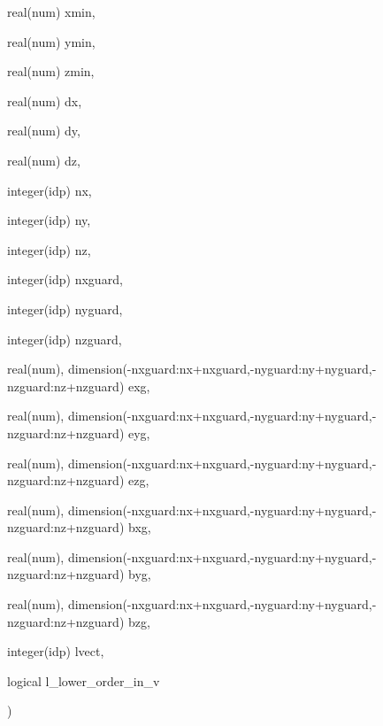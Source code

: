 {\begin{DoxyParamCaption}
\item[{real(num)}]{xmin, }
\item[{real(num)}]{ymin, }
\item[{real(num)}]{zmin, }
\item[{real(num)}]{dx, }
\item[{real(num)}]{dy, }
\item[{real(num)}]{dz, }
\item[{integer(idp)}]{nx, }
\item[{integer(idp)}]{ny, }
\item[{integer(idp)}]{nz, }
\item[{integer(idp)}]{nxguard, }
\item[{integer(idp)}]{nyguard, }
\item[{integer(idp)}]{nzguard, }
\item[{real(num), dimension(-\/nxguard\+:nx+nxguard,-\/nyguard\+:ny+nyguard,-\/nzguard\+:nz+nzguard)}]{exg, }
\item[{real(num), dimension(-\/nxguard\+:nx+nxguard,-\/nyguard\+:ny+nyguard,-\/nzguard\+:nz+nzguard)}]{eyg, }
\item[{real(num), dimension(-\/nxguard\+:nx+nxguard,-\/nyguard\+:ny+nyguard,-\/nzguard\+:nz+nzguard)}]{ezg, }
\item[{real(num), dimension(-\/nxguard\+:nx+nxguard,-\/nyguard\+:ny+nyguard,-\/nzguard\+:nz+nzguard)}]{bxg, }
\item[{real(num), dimension(-\/nxguard\+:nx+nxguard,-\/nyguard\+:ny+nyguard,-\/nzguard\+:nz+nzguard)}]{byg, }
\item[{real(num), dimension(-\/nxguard\+:nx+nxguard,-\/nyguard\+:ny+nyguard,-\/nzguard\+:nz+nzguard)}]{bzg, }
\item[{integer(idp)}]{lvect, }
\item[{logical}]{l\+\_\+lower\+\_\+order\+\_\+in\+\_\+v}
\end{DoxyParamCaption}
)}\hypertarget{field__gathering_8_f90_aa296f91b8369f8c698d2503f0fb6beb4}{}\label{field__gathering_8_f90_aa296f91b8369f8c698d2503f0fb6beb4}
